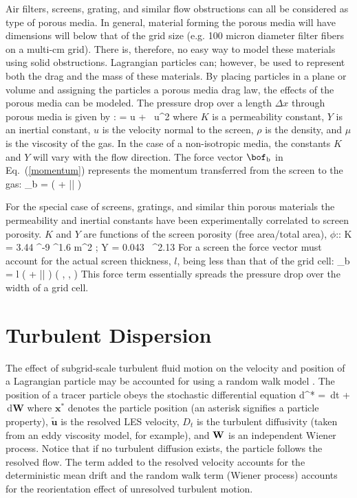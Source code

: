 Air filters, screens, grating, and similar flow obstructions can all be considered
as type of porous media. In general, material forming the porous media will have dimensions will below that of the grid size (e.g. 100 micron diameter filter fibers on a multi-cm grid).  There is, therefore, no easy way to model these materials using solid obstructions. Lagrangian particles can; however, be used to represent both the drag and the mass of these materials. By placing particles in a plane or volume and assigning the particles a porous media drag law, the effects of the porous media can be modeled. The pressure drop over a length $\Delta x$ through porous media is given by \cite{VafaiTien:1981}:
\be
    =   u + \rho {} \, u^2
\ee
where $K$ is a permeability constant, $Y$ is an inertial constant, $u$ is the velocity normal to the screen, $\rho$ is the density, and $\mu$ is the viscosity of the gas. In the case of a non-isotropic media, the constants $K$ and $Y$ will vary with the flow direction.
The force vector $\bof_{\rm b}$ in Eq.~(\ref{momentum}) represents the momentum transferred from the screen to the gas:
\be
   \bof_{\rm b} = \left(  + \rho {} |\bu| \right) \bu
\ee

For the special case of screens, gratings, and similar thin porous materials the permeability and inertial constants have been experimentally correlated to screen porosity.  $K$ and $Y$ are functions of the screen porosity (free area/total area), $\phi$:\cite{Bartzanas:1}:
\be
   K = 3.44 ^{-9} \; \phi^{1.6} \; \; \hbox{m}^2 \quad ; \quad Y = 0.043 \, \phi^{2.13}
\ee
For a screen the force vector must account for the actual screen thickness, $l$, being less than that of the grid cell:
\be
   \bof_{\rm b} = l \; \left(  + \rho {} |\bu| \right) \left(  ,  ,  \right)
\ee
This force term essentially spreads the pressure drop over the width of a grid cell.


\section{Turbulent Dispersion}

The effect of subgrid-scale turbulent fluid motion on the velocity and position of a Lagrangian particle may be accounted for using a random walk model \cite{Raman:CF}.  The position of a tracer particle obeys the stochastic differential equation
\be
\mbox{d}^* =  \,\mbox{d}t +  \,\mbox{d}\mbox{\textbf{W}}
\ee
where $\mathbf{x}^*$ denotes the particle position (an asterisk signifies a particle property), $\tilde{\mathbf{u}}$ is the resolved LES velocity, $D_t$ is the turbulent diffusivity (taken from an eddy viscosity model, for example), and $\mbox{\textbf{W}}$ is an independent Wiener process.  Notice that if no turbulent diffusion exists, the particle follows the resolved flow.  The term added to the resolved velocity accounts for the deterministic mean drift and the random walk term (Wiener process) accounts for the reorientation effect of unresolved turbulent motion.

